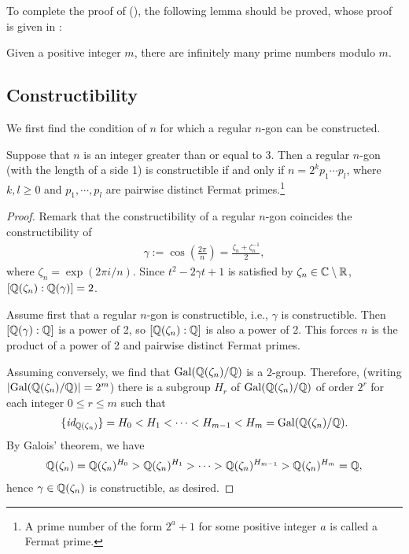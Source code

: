 To complete the proof of (), the following lemma should be proved, whose proof is given in :
\begin{lem}\label{infinitely many primes modulo an integer}
    Given a positive integer $m$, there are infinitely many prime numbers modulo $m$.
\end{lem}

\subsection{Constructibility}
We first find the condition of $n$ for which a regular $n$-gon can be constructed.
\begin{thm}
    Suppose that $n$ is an integer greater than or equal to 3.
    Then a regular $n$-gon (with the length of a side 1) is constructible if and only if $n=2^k p_1\cdots p_l$, where $k, l\geq 0$ and $p_1, \cdots, p_l$ are pairwise distinct Fermat primes.\footnote{A prime number of the form $2^a+1$ for some positive integer $a$ is called a Fermat prime.}
\end{thm}
\begin{proof}
    Remark that the constructibility of a regular $n$-gon coincides the constructibility of
    \begin{align*}
        \gamma:=\cos\left(\frac{2\pi}{n}\right)=\frac{\zeta_n+\zeta_n^{-1}}{2},
    \end{align*}
    where $\zeta_n=\exp(2\pi i/n)$.
    Since $t^2-2\gamma t+1$ is satisfied by $\zeta_n\in{\mathbb{C}}\setminus{\mathbb{R}}$, $[{\mathbb{Q}}(\zeta_n):{\mathbb{Q}}(\gamma)]=2$.

    Assume first that a regular $n$-gon is constructible, i.e., $\gamma$ is constructible.
    Then $[{\mathbb{Q}}(\gamma): {\mathbb{Q}}]$ is a power of 2, so $[{\mathbb{Q}}(\zeta_n):{\mathbb{Q}}]$ is also a power of 2.
    This forces $n$ is the product of a power of 2 and pairwise distinct Fermat primes.

    Assuming conversely, we find that ${\textrm{Gal}({{\mathbb{Q}}(\zeta_n)/{\mathbb{Q}}})}$ is a 2-group.
    Therefore, (writing $|{\textrm{Gal}({{\mathbb{Q}}(\zeta_n)/{\mathbb{Q}}})}|=2^m$) there is a subgroup $H_r$ of ${\textrm{Gal}({{\mathbb{Q}}(\zeta_n)/{\mathbb{Q}}})}$ of order $2^r$ for each integer $0\leq r\leq m$ such that
    \begin{align*}
        \{\textit{id}_{{\mathbb{Q}}(\zeta_n)}\}=H_0<H_1<\cdots<H_{m-1}<H_m={\textrm{Gal}({{\mathbb{Q}}(\zeta_n)/{\mathbb{Q}}})}.
    \end{align*}
    By Galois' theorem, we have
    \begin{align*}
        {\mathbb{Q}}(\zeta_n)={\mathbb{Q}}(\zeta_n)^{H_0}>{\mathbb{Q}}(\zeta_n)^{H_1}>\cdots>{\mathbb{Q}}(\zeta_n)^{H_{m-1}}>{\mathbb{Q}}(\zeta_n)^{H_m}={\mathbb{Q}},
    \end{align*}
    hence $\gamma\in{\mathbb{Q}}(\zeta_n)$ is constructible, as desired.
\end{proof}

